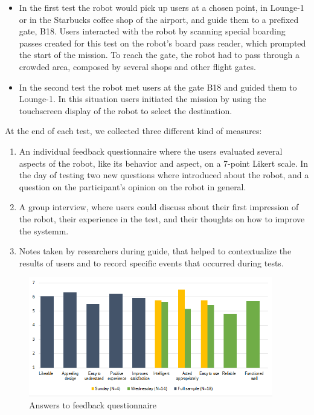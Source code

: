 \begin{itemize} 
\item In the first test the robot would pick up users at a chosen point, in Lounge-1 or in the Starbucks coffee shop of the airport, and guide them to a prefixed gate, B18. Users interacted with the robot by scanning special boarding passes created for this test on the robot's board pass reader, which prompted the start of the mission. To reach the gate, the robot had to pass through a crowded area, composed by several shops and other flight gates.
\item In the second test the robot met users at the gate B18 and guided them to Lounge-1. In this situation users initiated the mission by using the touchscreen display of the robot to select the destination.
\end{itemize}

At the end of each test, we collected three different kind of measures:
\begin{enumerate}
\item An individual feedback questionnaire where the users evaluated several aspects of the robot, like its behavior and aspect, on a 7-point Likert scale. In the day of testing two new questions where introduced about the robot, and a question on the participant's opinion on the robot in general.
\item A group interview, where users could discuss about their first impression of the robot, their experience in the test, and their thoughts on how to improve the systemm.
\item  Notes taken by researchers during guide, that helped to contextualize the results of users and to record specific events that occurred during tests.
\end{enumerate}


\begin{figure}[tb]
  \begin{center}
  \includegraphics[width=0.95\textwidth]{img/case_study/spencer/graph_subjective_questions.png}
  \end{center}
  \caption{Answers to feedback questionnaire}
  \label{fig:feedback_questionnaire}
\end{figure}


